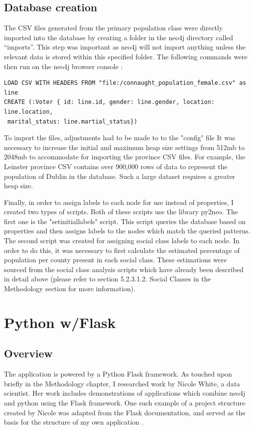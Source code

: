 \subsection{Database creation}
The CSV files generated from the primary population class were directly imported into the database by creating a folder in the neo4j directory called “imports”. This step was important as neo4j will not import anything unless the relevant data is stored within this specified folder. The following commands were then run on the neo4j browser console \cite{loadcsv}:
\begin{verbatim}
LOAD CSV WITH HEADERS FROM "file:/connaught_population_female.csv" as line
CREATE (:Voter { id: line.id, gender: line.gender, location: line.location,
 marital_status: line.martial_status})
\end{verbatim}
To import the files, adjustments had to be made to to the "config" file \cite{heapsize} It was necessary to increase the initial and maximum heap size settings from 512mb to 2048mb to accommodate for importing the province CSV files. For example, the Leinster province CSV contains over 900,000 rows of data to represent the population of Dublin in the database. Such a large dataset requires a greater heap size.

Finally, in order to assign labels to each node for use instead of properties, I created two types of scripts. Both of these scripts use the library py2neo. The first one is the "set\textunderscore initial\textunderscore labels" script. This script queries the database based on properties and then assigns labels to the nodes which match the queried patterns. The second script was created for assigning social class labels to each node. 
In order to do this, it was necessary to first calculate the estimated percentage of population per county present in each social class. These estimations were sourced from the social class analysis scripts which have already been described in detail above (please refer to section 5.2.3.1.2. Social Classes in the Methodology section for more information).
\pagebreak

\section{Python w/Flask}
\subsection{Overview}
The application is powered by a Python Flask framework. As touched upon briefly in the Methodology chapter, I researched work by Nicole White, a data scientist. Her work includes demonstrations of applications which combine neo4j and python using the Flask framework. One such example of a project structure created by Nicole was adapted from the Flask documentation, and served as the basis for the structure of my own application \cite{nicolewhite}.

